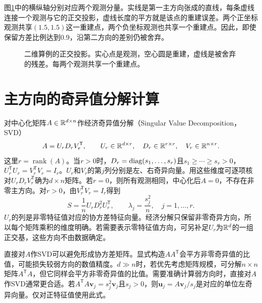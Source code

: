 图\ref{fig:pca-projection-example}中的横纵轴分别对应两个观测分量。实线是第一主方向张成的直线，每条虚线连接一个观测与它的正交投影，虚线长度的平方就是该点的重建误差。两个正坐标观测共享$(1.5,1.5)$这一重建点，两个负坐标观测也共享一个重建点。因此，即使保留方差比例达到$0.9$，沿第二方向的差别仍被舍弃。
\begin{figure}[htbp]
\centering
{}
\caption{二维算例的正交投影。实心点是观测，空心圆是重建，虚线是被舍弃的残差。每两个观测共享一个重建点。}
\label{fig:pca-projection-example}
\end{figure}

\section{主方向的奇异值分解计算}
对中心化矩阵$A\in\mathbb{R}^{d\times n}$作经济奇异值分解（Singular Value Decomposition，SVD）
\begin{equation}
 A=U_rD_rV_r^{\mathsf T},\qquad
 U_r\in\mathbb{R}^{d\times r},\quad D_r\in\mathbb{R}^{r\times r},\quad
 V_r\in\mathbb{R}^{n\times r}.
 \label{eq:pca-economic-svd}
\end{equation}
这里$r=\operatorname{rank}(A)$。当$r>0$时，$D_r=\operatorname{diag}(s_1,\ldots,s_r)$且$s_1\ge\cdots\ge s_r>0$，$U_r^{\mathsf T}U_r=V_r^{\mathsf T}V_r=I_r$。$U_r$和$V_r$的第$j$列分别是左、右奇异向量。用这些维度可逐项核对$U_rD_rV_r^{\mathsf T}$确为$d\times n$矩阵。若$r=0$，则所有观测相同，中心化后$A=0$，不存在非零主方向。对$r>0$，由$V_r^{\mathsf T}V_r=I_r$得到
\begin{equation}
 S=\frac1nU_rD_r^2U_r^{\mathsf T},\qquad
 \lambda_j=\frac{s_j^2}{n},\quad j=1,\ldots,r.
\end{equation}
$U_r$的列是非零特征值对应的协方差特征向量。经济分解只保留非零奇异方向，所以每个矩阵乘积的维度明确。若需要表示零特征值方向，可另补足$U_r$为$\mathbb{R}^d$的一组正交基，这些方向不由数据确定。

直接对$A$作SVD可以避免形成协方差矩阵。显式构造$AA^{\mathsf T}$会平方非零奇异值的比值，可能损失较弱方向的数值精度。$d\gg n$时，若优先考虑矩阵规模，可分解$n\times n$矩阵$A^{\mathsf T}A$，但它同样会平方非零奇异值的比值。需要准确计算弱方向时，直接对$A$作SVD通常更合适。若$A^{\mathsf T}A\bm v_j=s_j^2\bm v_j$且$s_j>0$，则$\bm u_j=A\bm v_j/s_j$是对应的单位左奇异向量。仅对正特征值使用此式。

